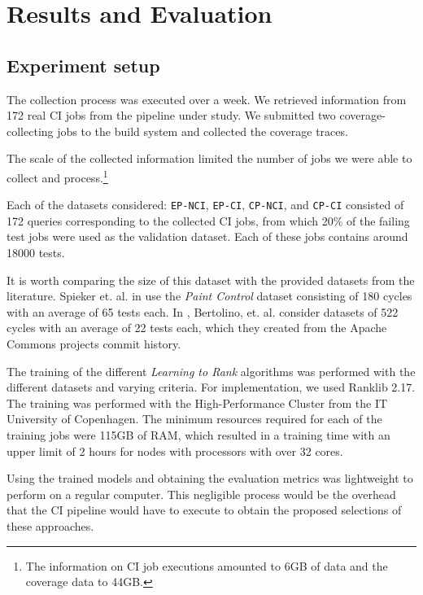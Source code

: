 \chapter{Results and Evaluation}\label{s:results}

\section{Experiment setup}

The collection process was executed over a week. We retrieved information from
172 real CI jobs from the pipeline under study. We submitted two coverage-collecting jobs 
to the build system and collected the coverage traces.

The scale of the collected information limited the number of jobs we were able to
collect and process.\footnote{The information on CI job executions amounted to 6GB of data and 
the coverage data to 44GB. }

Each of the datasets considered: \texttt{EP-NCI}, \texttt{EP-CI}, \texttt{CP-NCI}, and \texttt{CP-CI} 
consisted of 172 queries corresponding to the collected CI jobs, from which 20\% 
of the failing test jobs were used as the validation dataset. Each of these jobs
contains around 18000 tests.

It is worth comparing the size of this dataset with the provided datasets from the literature.
Spieker et. al. in \cite{DBLP:journals/corr/abs-1811-04122} use the \emph{Paint Control} dataset consisting of 180 cycles
with an average of 65 tests each.  In \cite{Bertolino2020LearningtoRankVR}, Bertolino, et. al. consider datasets
of 522 cycles with an average of 22 tests each, which they created from the Apache Commons projects 
commit history.

The training of the different \emph{Learning to Rank} algorithms was performed with the
different datasets and varying criteria. For implementation, we used Ranklib 2.17. The training
was performed with the High-Performance Cluster from the IT University of Copenhagen. The minimum resources 
required for each of the training jobs were 115GB of RAM, which resulted in a training time with an upper limit of 2 hours
for nodes with processors with over 32 cores.

Using the trained models and obtaining the evaluation metrics was lightweight to perform on
a regular computer. This negligible process would be the overhead that the CI pipeline would have to execute
to obtain the proposed selections of these approaches.

